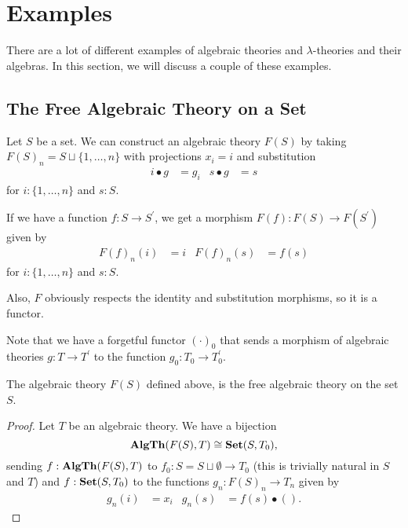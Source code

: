 \section{Examples}\label{sec:algebraic-theory-examples}

There are a lot of different examples of algebraic theories and $ \lambda $-theories and their algebras. In this section, we will discuss a couple of these examples.

\subsection{The Free Algebraic Theory on a Set}
\begin{example}
  Let $ S $ be a set. We can construct an algebraic theory $ F(S) $ by taking $ F(S)_n = S \sqcup \{ 1, \dots, n \} $ with projections $ x_i = i $ and substitution
  \begin{align*}
    i \bullet g &= g_i & s \bullet g &= s
  \end{align*}
  for $ i : \{ 1, \dots, n \} $ and $ s : S $.

  If we have a function $ f: S \to S^\prime $, we get a morphism $ F(f): F(S) \to F(S^\prime) $ given by
  \begin{align*}
    F(f)_n(i) &= i & F(f)_n(s) &= f(s)
  \end{align*}
  for $ i : \{ 1, \dots, n \} $ and $ s : S $.

  Also, $ F $ obviously respects the identity and substitution morphisms, so it is a functor.
\end{example}

Note that we have a forgetful functor $ (\cdot)_0 $ that sends a morphism of algebraic theories $ g: T \to T^\prime $ to the function $ g_0: T_0 \to T^\prime_0 $.

\begin{lemma}
  The algebraic theory $ F(S) $ defined above, is the free algebraic theory on the set $ S $.
\end{lemma}
\begin{proof}
  Let $ T $ be an algebraic theory. We have a bijection
  \[ \mathbf{AlgTh}(F(S), T) \cong \mathbf{Set}(S, T_0), \]
  sending $ f: \mathbf{AlgTh}(F(S), T) $ to $ f_0: S = S \sqcup \emptyset \to T_0 $ (this is trivially natural in $ S $ and $ T $) and $ f: \mathbf{Set}(S, T_0) $ to the functions $ g_n: F(S)_n \to T_n $ given by
  \begin{align*}
    g_n(i) &= x_i & g_n(s) &= f(s) \bullet ().
  \end{align*}
\end{proof}

